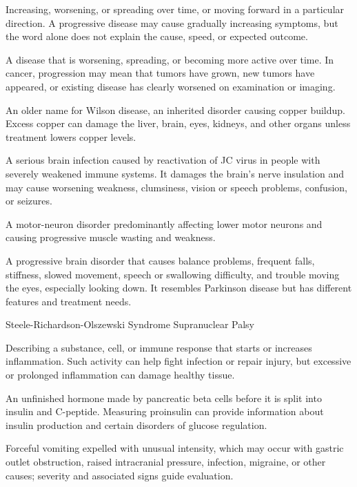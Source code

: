  Increasing, worsening, or spreading over time, or moving forward in a particular direction. A progressive disease may cause gradually increasing symptoms, but the word alone does not explain the cause, speed, or expected outcome.

 A disease that is worsening, spreading, or becoming more active over time. In cancer, progression may mean that tumors have grown, new tumors have appeared, or existing disease has clearly worsened on examination or imaging.

 An older name for Wilson disease, an inherited disorder causing copper buildup. Excess copper can damage the liver, brain, eyes, kidneys, and other organs unless treatment lowers copper levels.

 A serious brain infection caused by reactivation of JC virus in people with severely weakened immune systems. It damages the brain’s nerve insulation and may cause worsening weakness, clumsiness, vision or speech problems, confusion, or seizures.

 A motor-neuron disorder predominantly affecting lower motor neurons and causing progressive muscle wasting and weakness.

 A progressive brain disorder that causes balance problems, frequent falls, stiffness, slowed movement, speech or swallowing difficulty, and trouble moving the eyes, especially looking down. It resembles Parkinson disease but has different features and treatment needs.

\synonyms
Steele-Richardson-Olszewski Syndrome
Supranuclear Palsy

 Describing a substance, cell, or immune response that starts or increases inflammation. Such activity can help fight infection or repair injury, but excessive or prolonged inflammation can damage healthy tissue.

 An unfinished hormone made by pancreatic beta cells before it is split into insulin and C-peptide. Measuring proinsulin can provide information about insulin production and certain disorders of glucose regulation.

 Forceful vomiting expelled with unusual intensity, which may occur with gastric outlet obstruction, raised intracranial pressure, infection, migraine, or other causes; severity and associated signs guide evaluation.

